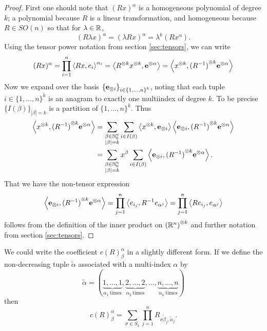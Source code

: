 \begin{proof}
  First one should note that $(Rx)^\alpha$ is a homogeneous polynomial of degree $k$; a polynomial because $R$ is a linear transformation, and homogeneous because $R \in SO(n)$ so that for $\lambda \in \RR$,
  \[
    (R\lambda x)^\alpha = (\lambda Rx)^\alpha = \lambda^k (Rx^\alpha).
  \]
  Using the tensor power notation from section \ref{sec:tensors}, we can write
  \[
    (Rx)^\alpha = \prod_{i = 1}^n \inner{Rx, e_i}^{\alpha_i} = \inner{R^{\otimes k} x^{\otimes k}, \bf{e}^{\otimes \alpha}} = \inner{x^{\otimes k}, {(R^{-1})}^{\otimes k}\bf{e}^{\otimes \alpha}}
  \]
  Now we expand over the basis ${\{\bf{e}_{\otimes i}\}}_{i \in {\{1, \ldots, n\}}^k}$, noting that each tuple $i \in {\{1, \ldots, n\}}^k$ is an anagram to exactly one multiindex of degree $k$. To be precise ${\{I(\beta)\}}_{|\beta| = k}$ is a partition of ${\{1, \ldots, n\}}^k$.
  Thus 
  \begin{align*}
    \inner{x^{\otimes k}, {(R^{-1})}^{\otimes k}\bf{e}^{\otimes \alpha}}
      &= \sum_{\substack{\beta \in \NN_0^n \\ |\beta| = k}} \sum_{i \in I(\beta)} \inner{x^{\otimes k}, \bf{e}_{\otimes i}} \inner{\bf{e}_{\otimes i}, {(R^{-1})}^{\otimes k}\bf{e}^{\otimes \alpha}} \\
      &= \sum_{\substack{\beta \in \NN_0^n \\ |\beta| = k}} x^\beta \sum_{i \in I(\beta)} \inner{\bf{e}_{\otimes i}, {(R^{-1})}^{\otimes k}\bf{e}^{\otimes \alpha}}.
  \end{align*}
  That we have the non-tensor expression 
  \[
    \inner{\bf{e}_{\otimes i}, {(R^{-1})}^{\otimes k}\bf{e}^{\otimes \alpha}} = \prod_{j = 1}^n \inner{e_{i_j}, R^{-1}e_{\alpha^j}} = \prod_{j = 1}^n \inner{Re_{i_j}, e_{\alpha^j}}
  \]
  follows from the definition of the inner product on ${(\RR^n)}^{\otimes k}$ and further notation from section \ref{sec:tensors}.
\end{proof}
\begin{remark}
  We could write the coefficient $c(R)^\alpha_\beta$ in a slightly different form. If we define the non-decreasing tuple $\tilde{\alpha}$ associated with a multi-index $\alpha$ by
  \[
    \tilde{\alpha} = (\underbrace{1, \ldots, 1}_{\alpha_1 ~\text{times}}, \underbrace{2, \ldots, 2}_{\alpha_2 ~\text{times}}, \ldots , \underbrace{n, \ldots, n}_{\alpha_n ~\text{times}})
  \]
  then 
  \[
    c(R)^\alpha_\beta = \sum_{\sigma \in S_k} \prod_{j = 1}^n R_{\sigma \tilde{\beta}_j, \tilde{\alpha}_j}. 
  \]
\end{remark}

